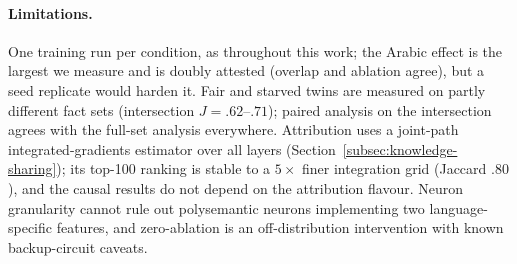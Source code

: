 \paragraph{Limitations.}
One training run per condition, as throughout this work; the Arabic effect is
the largest we measure and is doubly attested (overlap and ablation agree),
but a seed replicate would harden it. Fair and starved twins are measured on
partly different fact sets (intersection $J = .62$--$.71$); paired analysis on
the intersection agrees with the full-set analysis everywhere. Attribution
uses a joint-path integrated-gradients estimator over all layers
(Section~\ref{subsec:knowledge-sharing}); its top-100 ranking is stable to a
$5\times$ finer integration grid (Jaccard $.80$), and the causal results do
not depend on the attribution flavour. Neuron granularity cannot rule out
polysemantic neurons implementing two language-specific features, and
zero-ablation is an off-distribution intervention with known backup-circuit
caveats.
